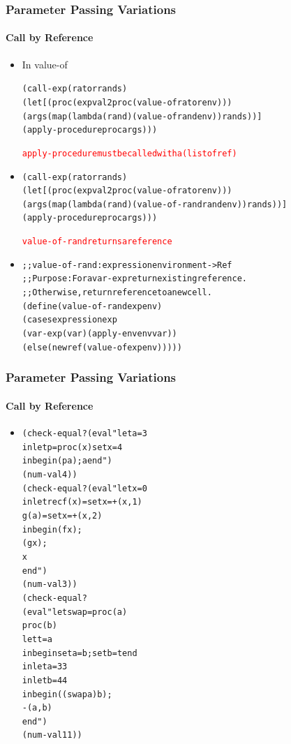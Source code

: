 \documentclass{beamer}
\begin{document}
\begin{frame}[fragile]
\frametitle{Parameter Passing Variations}
\framesubtitle{Call by Reference}
\begin{scriptsize}
\begin{itemize}
\item<1-> In value-of
\begin{alltt}
(call-exp (rator rands)
  (let [(proc (expval2proc (value-of rator env)))
        (args (map (lambda (rand) (value-of rand env)) rands))]
    (apply-procedure proc args)))

\textcolor{red}{apply-procedure must be called with a (listof ref)}
\end{alltt}

\item<2->
\begin{alltt}
(call-exp (rator rands)
  (let [(proc (expval2proc (value-of rator env)))
        (args (map (lambda (rand) (value-of-rand rand env)) rands))]
    (apply-procedure proc args)))

\textcolor{red}{value-of-rand returns a reference}
\end{alltt}

\item<3->
\begin{alltt}
;; value-of-rand : expression environment -> Ref
;; Purpose: For a var-exp return existing reference.
;;          Otherwise, return reference to a new cell.
(define (value-of-rand exp env)
  (cases expression exp
    (var-exp (var) (apply-env env var))
    (else (newref (value-of exp env)))))
\end{alltt}

\end{itemize}
\end{scriptsize}
\end{frame}

\begin{frame}[fragile]
\frametitle{Parameter Passing Variations}
\framesubtitle{Call by Reference}
\begin{scriptsize}
\begin{itemize}
\item<1->
\begin{alltt}
(check-equal? (eval "let a = 3
                     in let p = proc (x) set x = 4
                        in begin (p a); a end")
              (num-val 4))
(check-equal? (eval "let x = 0
                     in letrec f (x) = set x = +(x, 1)
                               g (a) = set x = +(x, 2)
                        in begin (f x);
                                 (g x);
                                 x
                           end")
              (num-val 3))
(check-equal?
 (eval "let swap = proc (a)
                    proc (b)
                      let t = a
                      in begin set a = b;  set b = t  end
        in let a = 33
           in let b = 44
              in begin ((swap a) b);
                       -(a, b)
                 end")
 (num-val 11))
\end{alltt}

\end{itemize}
\end{scriptsize}
\end{frame}
\end{document}
